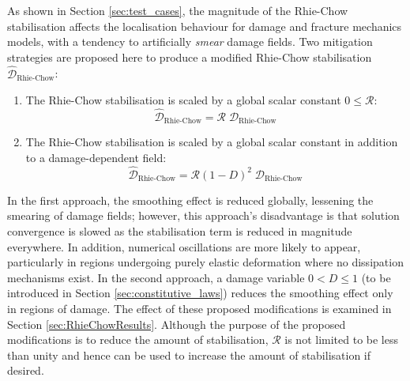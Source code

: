 \documentclass[sn-mathphys,Numbered]{sn-jnl}%
\begin{document}
As shown in Section \ref{sec:test_cases}, the magnitude of the Rhie-Chow stabilisation affects the localisation behaviour for damage and fracture mechanics models, with a tendency to artificially \emph{smear} damage fields.
Two mitigation strategies are proposed here to produce a modified Rhie-Chow stabilisation $\hat{\mathcal{D}}_{\text {Rhie-Chow}}$:
\begin{enumerate}[label=(\alph*)]
	\item The Rhie-Chow stabilisation is scaled by a global scalar constant $0 \leq \mathcal{R}$:
	\begin{equation}
		\hat{\mathcal{D}}_{\text{Rhie-Chow}} = \mathcal{R} \; \mathcal{D}_{\text {Rhie-Chow}}
	\end{equation}
	\item The Rhie-Chow stabilisation is scaled by a global scalar constant in addition to a damage-dependent field:
	\begin{equation}
		\hat{\mathcal{D}}_{\text{Rhie-Chow}} = \mathcal{R} (1-D)^2 \; \mathcal{D}_{\text {Rhie-Chow}}
	\end{equation}
\end{enumerate}
In the first approach, the smoothing effect is reduced globally, lessening the smearing of damage fields; however, this approach's disadvantage is that solution convergence is slowed as the stabilisation term is reduced in magnitude everywhere.
In addition, numerical oscillations are more likely to appear, particularly in regions undergoing purely elastic deformation where no dissipation mechanisms exist.
In the second approach, a damage variable $0 < D \leq 1$ (to be introduced in Section \ref{sec:constitutive_laws}) reduces the smoothing effect only in regions of damage.
The effect of these proposed modifications is examined in Section \ref{sec:RhieChowResults}.
Although the purpose of the proposed modifications is to reduce the amount of stabilisation, $\mathcal{R}$ is not limited to be less than unity and hence can be used to increase the amount of stabilisation if desired.


\end{document}
